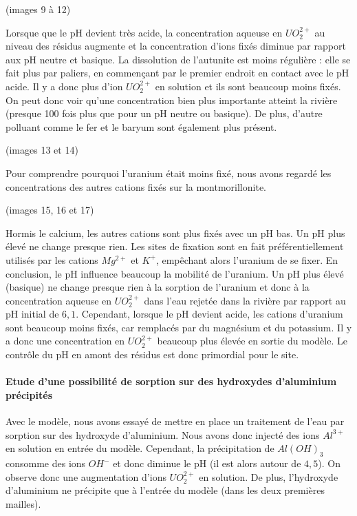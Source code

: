 \documentclass{article}
\begin{document}
(images 9 à 12)

Lorsque que le pH devient très acide, la concentration aqueuse en $UO_2^{2+}$ au niveau des résidus augmente et la concentration d’ions fixés diminue par rapport aux pH neutre et basique. La dissolution de l’autunite est moins régulière : elle se fait plus par paliers, en commençant par le premier endroit en contact avec le pH acide. Il y a donc plus d’ion $UO_2^{2+}$ en solution et ils sont beaucoup moins fixés. On peut donc voir qu’une concentration bien plus importante atteint la rivière (presque 100 fois plus que pour un pH neutre ou basique). De plus, d’autre polluant comme le fer et le baryum sont également plus présent.

(images 13 et 14)

Pour comprendre pourquoi l’uranium était moins fixé, nous avons regardé les concentrations des autres cations fixés sur la montmorillonite.

(images 15, 16 et 17)

Hormis le calcium, les autres cations sont plus fixés avec un pH bas. Un pH plus élevé ne change presque rien. Les sites de fixation sont en fait préférentiellement utilisés par les cations $Mg^{2+}$ et $K^{+}$, empêchant alors l’uranium de se fixer.
En conclusion, le pH influence beaucoup la mobilité de l’uranium. Un pH plus élevé (basique) ne change presque rien à la sorption de l’uranium et donc à la concentration aqueuse en $UO_2^{2+}$ dans l’eau rejetée dans la rivière par rapport au pH initial de $6,1$. Cependant, lorsque le pH devient acide, les cations d’uranium sont beaucoup moins fixés, car remplacés par du magnésium et du potassium. Il y a donc une concentration en $UO_2^{2+}$ beaucoup plus élevée en sortie du modèle. Le contrôle du pH en amont des résidus est donc primordial pour le site.

\paragraph{Etude d'une possibilité de sorption sur des hydroxydes d'aluminium précipités}
Avec le modèle, nous avons essayé de mettre en place un traitement de l’eau par sorption sur des hydroxyde d’aluminium. Nous avons donc injecté des ions $Al^{3+}$ en solution en entrée du modèle. Cependant, la précipitation de $Al(OH)_3$ consomme des ions $OH^{-}$ et donc diminue le pH (il est alors autour de $4,5$). On observe donc une augmentation d’ions $UO_2^{2+}$ en solution. De plus, l’hydroxyde d’aluminium ne précipite que à l’entrée du modèle (dans les deux premières mailles).
\end{document}
